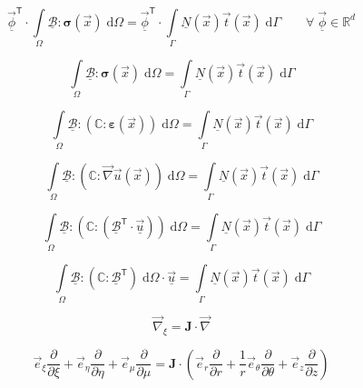 \documentclass[times,namecite]{goose-article}
\begin{document}
\begin{equation}
  \underline{\vec{\phi}}^\mathsf{T} \cdot
  \int\limits_\Omega
    \underline{\mathcal{B}} : \bm{\sigma}(\vec{x}) \;
  \mathrm{d}\Omega
  =
  \underline{\vec{\phi}}^\mathsf{T} \cdot
  \int\limits_\Gamma
    \underline{N}(\vec{x}) \vec{t}(\vec{x}) \;
  \mathrm{d}\Gamma
  \qquad
  \forall \; \underline{\vec{\phi}} \in \mathbb{R}^d
\end{equation}


\begin{equation}
  \int\limits_\Omega
    \underline{\mathcal{B}} : \bm{\sigma}(\vec{x}) \;
  \mathrm{d}\Omega
  =
  \int\limits_\Gamma
    \underline{N}(\vec{x}) \vec{t}(\vec{x}) \;
  \mathrm{d}\Gamma
\end{equation}

\begin{equation}
  \int\limits_\Omega
    \underline{\mathcal{B}} : \left( \mathbb{C} : \bm{\varepsilon}(\vec{x}) \right) \;
  \mathrm{d}\Omega
  =
  \int\limits_\Gamma
    \underline{N}(\vec{x}) \vec{t}(\vec{x}) \;
  \mathrm{d}\Gamma
\end{equation}

\begin{equation}
  \int\limits_\Omega
    \underline{\mathcal{B}} : \left( \mathbb{C} : \vec{\nabla}\vec{u}(\vec{x}) \right) \;
  \mathrm{d}\Omega
  =
  \int\limits_\Gamma
    \underline{N}(\vec{x}) \vec{t}(\vec{x}) \;
  \mathrm{d}\Gamma
\end{equation}

\begin{equation}
  \int\limits_\Omega
    \underline{\mathcal{B}} : \left( \mathbb{C} :( \underline{\mathcal{B}}^\mathsf{T} \cdot \underline{\vec{u}}) \right) \;
  \mathrm{d}\Omega
  =
  \int\limits_\Gamma
    \underline{N}(\vec{x}) \vec{t}(\vec{x}) \;
  \mathrm{d}\Gamma
\end{equation}

\begin{equation}
  \int\limits_\Omega
    \underline{\mathcal{B}} : \left( \mathbb{C} : \underline{\mathcal{B}}^\mathsf{T} \right) \;
  \mathrm{d}\Omega
  \cdot \underline{\vec{u}}
  =
  \int\limits_\Gamma
    \underline{N}(\vec{x}) \vec{t}(\vec{x}) \;
  \mathrm{d}\Gamma
\end{equation}

\begin{equation}
  \vec{\nabla}_\xi = \bm{J} \cdot \vec{\nabla}
\end{equation}

\begin{equation}
  \vec{e}_\xi  \frac{\partial}{\partial \xi }  +
  \vec{e}_\eta \frac{\partial}{\partial \eta} +
  \vec{e}_\mu  \frac{\partial}{\partial \mu}
  =
  \bm{J} \cdot
  \left(
              \vec{e}_r      \frac{\partial}{\partial r     } +
  \frac{1}{r} \vec{e}_\theta \frac{\partial}{\partial \theta} +
              \vec{e}_z      \frac{\partial}{\partial z     }
  \right)
\end{equation}
\end{document}
